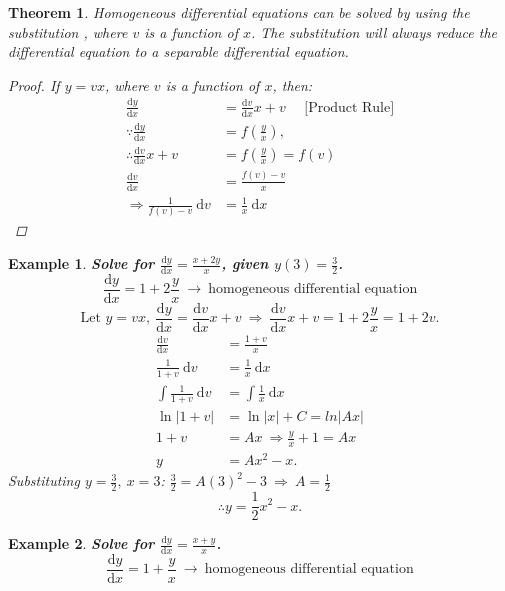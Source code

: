 \documentclass[12pt, a4paper]{article}
\newtheorem{theorem}{Theorem}[subsection]
\newtheorem{example}{Example}[subsection]
\newtheorem{proof}{Proof}[subsection]
\def\d{{\mathrm{d}}}
\begin{document}
\begin{enumerate}
    \begin{theorem}
        Homogeneous differential equations can be solved by using the substitution \textbf{\color{red}{$y=vx$}}, where $v$ is a function of $x$. The substitution will always reduce the differential equation to a separable differential equation. 
        \begin{proof}
            If $y=vx$, where $v$ is a function of $x$, then: 
            $$\begin{aligned}
                \frac{\d y}{\d x}&=\frac{\d v}{\d x}x+v\ \ \ \ \ \ \text{[Product Rule]}\\
                \because \frac{\d y}{\d x}&=f\left(\frac{y}{x}\right),\\
                \therefore \frac{\d v}{\d x}x+v&=f\left(\frac{y}{x}\right)=f(v)\\
                \frac{\d v}{\d x}&=\frac{f(v)-v}{x}\\
                \Rightarrow \frac{1}{f(v)-v}\ \d v&=\frac{1}{x}\ \d x
            \end{aligned}$$
        \end{proof}
    \end{theorem}
    \begin{example}
        \textbf{Solve for $\frac{\d y}{\d x}=\frac{x+2y}{x}$, given $y(3)=\frac{3}{2}$.}
        $$\frac{\d y}{\d x}=1+2\frac{y}{x}\ \rightarrow\ \text{homogeneous differential equation}$$
        $$\text{Let }y=vx,\ \frac{\d y}{\d x}=\frac{\d v}{\d x}x+v\ \Rightarrow\ \frac{\d v}{\d x}x+v=1+2\frac{y}{x}=1+2v.$$
        $$\begin{aligned}
            \frac{\d v}{\d x}&=\frac{1+v}{x}\\
            \frac{1}{1+v}\ \d v&=\frac{1}{x}\ \d x\\
            \int \frac{1}{1+v}\ \d v&=\int \frac{1}{x}\ \d x\\
            \ln|1+v|&=\ln|x|+C=ln|Ax|\\
            1+v&=Ax\ \Rightarrow \frac{y}{x}+1=Ax\\
            y&=Ax^2-x.
        \end{aligned}$$
        Substituting $y=\frac{3}{2},\ x=3$: $\frac{3}{2}=A(3)^2-3\ \Rightarrow\ A=\frac{1}{2}$
        $$\therefore y=\frac{1}{2}x^2-x.$$
    \end{example}
    \begin{example}
        \textbf{Solve for $\frac{\d y}{\d x}=\frac{x+y}{x}$.}
        $$\frac{\d y}{\d x}=1+\frac{y}{x}\ \rightarrow\ \text{homogeneous differential equation}$$

\end{example}
\end{enumerate}
\end{document}
